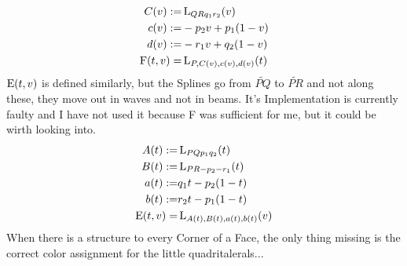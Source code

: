     $$\begin{aligned}
        C(v) :=& \operatorname{L}_{QRq_1r_2}(v) \\
        c(v) :=& -p_2v + p_1(1-v) \\
        d(v) :=& -r_1v + q_2(1-v) \\
        \operatorname{F}(t, v) =& \operatorname{L}_{P,C(v),c(v),d(v)}(t) \\
    \end{aligned}$$
    $\operatorname{E}(t, v)$ is defined similarly, but the Splines go from $\widetilde{PQ}$ to $\widetilde{PR}$ and not along these, they move out in waves and not in beams. It's Implementation is currently faulty and I have not used it because F was sufficient for me, but it could be wirth looking into.
    $$\begin{aligned}
        A(t) :=& \operatorname{L}_{PQp_1q_2}(t) \\
        B(t) :=& \operatorname{L}_{PR-p_2-r_1}(t) \\
        a(t) :=&  q_1t - p_2(1-t) \\
        b(t) :=&  r_2t - p_1(1-t) \\
        \operatorname{E}(t, v) =& \operatorname{L}_{A(t),B(t),a(t),b(t)}(v) \\
    \end{aligned}$$
    When there is a structure to every Corner of a Face, the only thing missing is the correct color assignment for the little quadritalerals...
